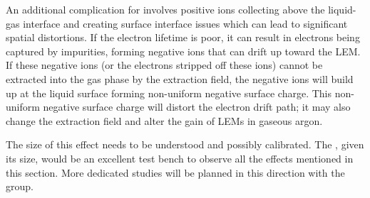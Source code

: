 An additional complication for \dual involves positive ions collecting above the liquid-gas interface and creating surface interface issues which can lead to significant spatial distortions. If the electron lifetime is poor, it can result in electrons being captured by impurities, forming negative ions that can drift up toward the LEM. If these negative ions (or the electrons stripped off these ions) cannot be extracted into the gas phase by the extraction field, the  
negative ions will build up at the liquid surface forming non-uniform negative surface charge. This non-uniform negative surface charge will distort the electron drift path; %
it may also change the extraction field and alter the gain of LEMs in gaseous argon.%

The size of this effect needs to be understood and possibly calibrated. The , given its size, would %
be an excellent test bench to observe all the effects mentioned in this section. More dedicated studies will be planned in this direction with the  group.